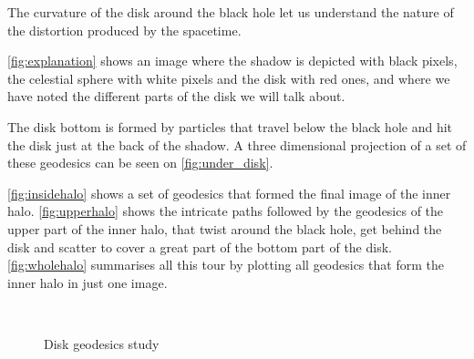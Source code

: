 The curvature of the disk around the black hole let us understand the nature of the distortion produced by the spacetime.

\autoref{fig:explanation} shows an image where the shadow is depicted with black pixels, the celestial sphere with white pixels and the disk with red ones, and where we have noted the different parts of the disk we will talk about.

The disk bottom is formed by particles that travel below the black hole and hit the disk just at the back of the shadow. A three dimensional projection of a set of these geodesics can be seen on \autoref{fig:under_disk}.

\autoref{fig:insidehalo} shows a set of geodesics that formed the final image of the inner halo. \autoref{fig:upperhalo} shows the intricate paths followed by the geodesics of the upper part of the inner halo, that twist around the black hole, get behind the disk and scatter to cover a great part of the bottom part of the disk. \autoref{fig:wholehalo} summarises all this tour by plotting all geodesics that form the inner halo in just one image.

\begin{figure}[bth]
	\myfloatalign
	 \quad
	 \\
	 \quad
	\caption[Disk geodesics study]{Disk geodesics study}\label{fig:diskgeodesicstudy}
\end{figure}

